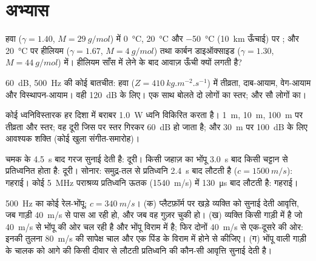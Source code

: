 \section{अभ्यास}

\begin{exercise}[$\star$]\label{exo:b2:sound-waves:1}
हवा ($\gamma = 1.40$, $M = \qty{29}{g/mol}$) में \qty{0}{\degreeCelsius},
\qty{20}{\degreeCelsius} और \qty{-50}{\degreeCelsius} (\qty{10}{km} ऊँचाई) पर
; और \qty{20}{\degreeCelsius} पर हीलियम ($\gamma = 1.67$, $M = \qty{4}{g/mol}$) तथा
कार्बन डाइऑक्साइड ($\gamma = 1.30$, $M = \qty{44}{g/mol}$) में।
हीलियम साँस में लेने के बाद आवाज़ ऊँची क्यों लगती है?
\end{exercise}

\begin{exercise}[$\star$]\label{exo:b2:sound-waves:2}
\qty{60}{dB}, \qty{500}{Hz} की कोई बातचीत: हवा
($Z = \qty{410}{kg.m^{-2}.s^{-1}}$) में तीव्रता, दाब-आयाम,
वेग-आयाम और विस्थापन-आयाम। वही \qty{120}{dB} के लिए। एक साथ बोलते दो
लोगों का स्तर; और सौ लोगों का।
\end{exercise}

\begin{exercise}[$\star$]\label{exo:b2:sound-waves:3}
कोई ध्वनिविस्तारक हर दिशा में बराबर \qty{1.0}{W} ध्वनि विकिरित करता है।
\qty{1}{m}, \qty{10}{m}, \qty{100}{m} पर तीव्रता और स्तर; वह दूरी जिस पर
स्तर गिरकर \qty{60}{dB} हो जाता है; और \qty{30}{m} पर \qty{100}{dB} के लिए आवश्यक शक्ति
(कोई खुला संगीत-समारोह)।
\end{exercise}

\begin{exercise}[$\star$]\label{exo:b2:sound-waves:4}
चमक के \qty{4.5}{s} बाद गरज सुनाई देती है: दूरी। किसी जहाज़ का भोंपू
\qty{3.0}{s} बाद किसी चट्टान से प्रतिध्वनित होता है: दूरी। सोनार: समुद्र-तल से
प्रतिध्वनि \qty{2.4}{s} बाद लौटती है ($c = \qty{1500}{m/s}$): गहराई। कोई
\qty{5}{MHz} पराश्रव्य प्रतिध्वनि ऊतक (\qty{1540}{m/s}) में \qty{130}{\micro s} बाद
लौटती है: गहराई।
\end{exercise}

\begin{exercise}[$\star\star$]\label{exo:b2:sound-waves:5}
\qty{500}{Hz} का कोई रेल-भोंपू; $c = \qty{340}{m/s}$। (क) प्लैटफ़ॉर्म पर खड़े
व्यक्ति को सुनाई देती आवृत्ति, जब गाड़ी \qty{40}{m/s} से पास आ रही हो, और
जब वह गुज़र चुकी हो। (ख) व्यक्ति किसी गाड़ी में है जो \qty{40}{m/s} से भोंपू
की ओर चल रही है और भोंपू विराम में है; फिर दोनों \qty{40}{m/s} से एक-दूसरे
की ओर: इनकी तुलना \qty{80}{m/s} की सापेक्ष चाल और एक पिंड के विराम में होने से
कीजिए। (ग) भोंपू वाली गाड़ी के चालक को आगे की किसी दीवार से लौटती
प्रतिध्वनि की कौन-सी आवृत्ति सुनाई देती है।
\end{exercise}

